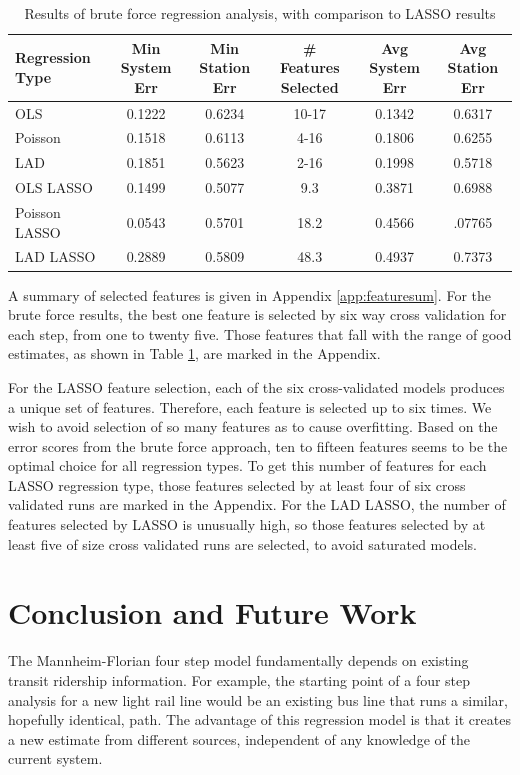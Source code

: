 \documentclass[11pt]{article}
\begin{document}
\begin{table}
\begingroup\fontsize{10}{15}\selectfont
\centering
\begin{tabular}{l|ccccc}
Regression Type& Min System Err&Min Station Err& \# Features Selected& Avg System Err& Avg Station Err\\
\midrule
OLS&0.1222&0.6234&10-17&0.1342&0.6317\\
Poisson&0.1518&0.6113&4-16&0.1806&0.6255\\
LAD&0.1851&0.5623&2-16&0.1998&0.5718\\
\midrule
OLS LASSO&0.1499&0.5077&9.3&0.3871&0.6988\\
Poisson LASSO&0.0543&0.5701&18.2&0.4566&.07765\\
LAD LASSO&0.2889&0.5809&48.3&0.4937&0.7373\\
\end{tabular}
\caption{Results of brute force regression analysis, with comparison to LASSO results}\label{tab:bfresults}
\endgroup
\end{table}

A summary of selected features is given in Appendix \ref{app:featuresum}. For the brute force results, the best one feature is selected by six way cross validation for each step, from one to twenty five. Those features that fall with the range of good estimates, as shown in Table \ref{tab:bfresults}, are marked in the Appendix. 


For the LASSO feature selection, each of the six cross-validated models produces a unique set of features. Therefore, each feature is selected up to six times. We wish to avoid selection of so many features as to cause overfitting. Based on the error scores from the brute force approach, ten to fifteen features seems to be the optimal choice for all regression types. To get this number of features for each LASSO regression type, those features selected by at least four of six cross validated runs are marked in the Appendix. For the LAD LASSO, the number of features selected by LASSO is unusually high, so those features selected by at least five of size cross validated runs are selected, to avoid saturated models. 

\section{Conclusion and Future Work}

The Mannheim-Florian four step model fundamentally depends on existing transit ridership information. For example, the starting point of a four step analysis for a new light rail line would be an existing bus line that runs a similar, hopefully identical, path. The advantage of this regression model is that it creates a new estimate from different sources, independent of any knowledge of the current system.
\end{document}

